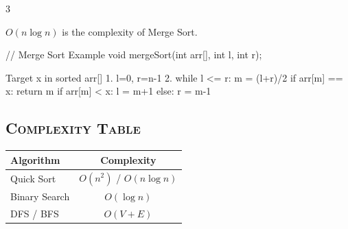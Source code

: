 \begin{multicols*}{3}
\begin{example}
    $O(n \log n)$ is the complexity of Merge Sort.
\end{example}

\begin{codeexample}[language=C++]
// Merge Sort Example
void mergeSort(int arr[], int l, int r);
\end{codeexample}

\begin{algorithm}[caption=Binary Search]
Target x in sorted arr[]
1. l=0, r=n-1
2. while l <= r:
   m = (l+r)/2
   if arr[m] == x: return m
   if arr[m] < x: l = m+1
   else: r = m-1
\end{algorithm}

\subsection{\textsc{Complexity Table}}
\hdashrule[0pt]{\columnwidth}{0.5pt}{1mm}
\vspace{10pt}

\begin{center}
    \begin{tabular}{l|c}
    \textbf{Algorithm} & \textbf{Complexity} \\
    \hline\hline
    Quick Sort & $O(n^2)$ / $O(n \log n)$ \\
    Binary Search & $O(\log n)$ \\
    DFS / BFS & $O(V + E)$ \\
    \end{tabular}
\end{center}

\end{multicols*}

